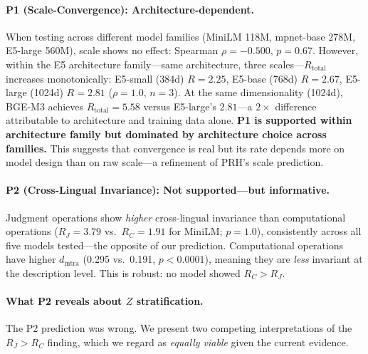 \documentclass[11pt]{article}
\theoremstyle{definition}
\begin{document}
\paragraph{P1 (Scale-Convergence): Architecture-dependent.}
When testing across different model families (MiniLM 118M, mpnet-base 278M, E5-large 560M), scale shows no effect: Spearman $\rho = -0.500$, $p = 0.67$. However, within the E5 architecture family---same architecture, three scales---$R_{\text{total}}$ increases monotonically: E5-small (384d) $R = 2.25$, E5-base (768d) $R = 2.67$, E5-large (1024d) $R = 2.81$ ($\rho = 1.0$, $n = 3$). At the same dimensionality (1024d), BGE-M3 achieves $R_{\text{total}} = 5.58$ versus E5-large's $2.81$---a $2\times$ difference attributable to architecture and training data alone. \textbf{P1 is supported within architecture family but dominated by architecture choice across families.} This suggests that convergence is real but its rate depends more on model design than on raw scale---a refinement of PRH's scale prediction.

\paragraph{P2 (Cross-Lingual Invariance): Not supported---but informative.}
Judgment operations show \emph{higher} cross-lingual invariance than computational operations ($R_J = 3.79$ vs.\ $R_C = 1.91$ for MiniLM; $p=1.0$), consistently across all five models tested---the opposite of our prediction. Computational operations have higher $d_{\text{intra}}$ (0.295 vs.\ 0.191, $p < 0.0001$), meaning they are \emph{less} invariant at the description level. This is robust: no model showed $R_C > R_J$.

\paragraph{What P2 reveals about $Z$ stratification.}
The P2 prediction was wrong. We present two competing interpretations of the $R_J > R_C$ finding, which we regard as \emph{equally viable} given the current evidence.
\end{document}
